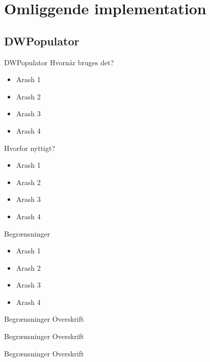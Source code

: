 \section{Omliggende implementation}

\subsection{DWPopulator}
\begin{frame}{DWPopulator}{}
  Hvornår bruges det?
  \begin{itemize}
    \item<1-> Arash 1
    \item<2-> Arash 2
    \item<3-> Arash 3
    \item<4-> Arash 4
  \end{itemize}
  Hvorfor nyttigt?
  \begin{itemize}
    \item<1-> Arash 1
    \item<2-> Arash 2
    \item<3-> Arash 3
    \item<4-> Arash 4
  \end{itemize}
\end{frame}

\begin{frame}{Begrænsninger}{}
  \begin{itemize}
    \item<1-> Arash 1
    \item<2-> Arash 2
    \item<3-> Arash 3
    \item<4-> Arash 4
  \end{itemize}
\end{frame}

\begin{frame}{Begrænsninger}{}
  Overskrift
\end{frame}

\begin{frame}{Begrænsninger}{}
  Overskrift
\end{frame}

\begin{frame}{Begrænsninger}{}
  Overskrift
\end{frame}

